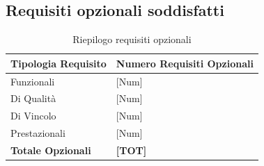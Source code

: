 \subsection{Requisiti opzionali soddisfatti}
\begin{table}[ht]
	\centering
	\renewcommand{\arraystretch}{1.4}
	\begin{tabularx}{0.8\textwidth}{|l|X|}
		\hline
		\rowcolor{primarycolor!10}
		\textbf{Tipologia Requisito} & \textbf{Numero Requisiti Opzionali} \\
		\hline
		Funzionali & [Num] \\
		\hline
		Di Qualità & [Num] \\
		\hline
		Di Vincolo & [Num] \\
		\hline
		Prestazionali & [Num] \\
		\hline
		\textbf{Totale Opzionali} & \textbf{[TOT]} \\
		\hline
	\end{tabularx}
	\caption{Riepilogo requisiti opzionali}
\end{table}